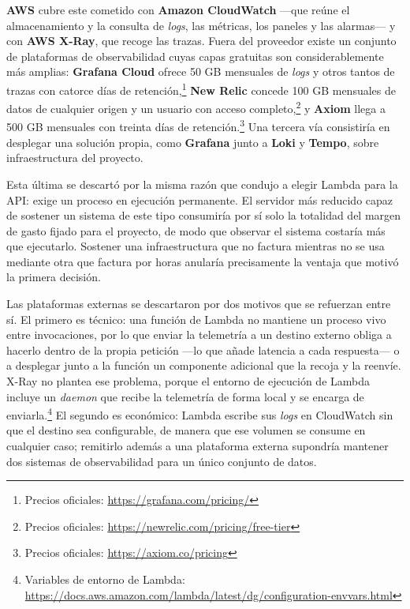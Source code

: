 \textbf{AWS} cubre este cometido con \textbf{Amazon CloudWatch} —que reúne el almacenamiento y la consulta de \textit{logs}, las métricas, los paneles y las alarmas— y con \textbf{AWS X-Ray}, que recoge las trazas. Fuera del proveedor existe un conjunto de plataformas de observabilidad cuyas capas gratuitas son considerablemente más amplias: \textbf{Grafana Cloud} ofrece 50 GB mensuales de \textit{logs} y otros tantos de trazas con catorce días de retención,\footnote{Precios oficiales: \url{https://grafana.com/pricing/}} \textbf{New Relic} concede 100 GB mensuales de datos de cualquier origen y un usuario con acceso completo,\footnote{Precios oficiales: \url{https://newrelic.com/pricing/free-tier}} y \textbf{Axiom} llega a 500 GB mensuales con treinta días de retención.\footnote{Precios oficiales: \url{https://axiom.co/pricing}} Una tercera vía consistiría en desplegar una solución propia, como \textbf{Grafana} junto a \textbf{Loki} y \textbf{Tempo}, sobre infraestructura del proyecto.

Esta última se descartó por la misma razón que condujo a elegir Lambda para la API: exige un proceso en ejecución permanente. El servidor más reducido capaz de sostener un sistema de este tipo consumiría por sí solo la totalidad del margen de gasto fijado para el proyecto, de modo que observar el sistema costaría más que ejecutarlo. Sostener una infraestructura que no factura mientras no se usa mediante otra que factura por horas anularía precisamente la ventaja que motivó la primera decisión.

Las plataformas externas se descartaron por dos motivos que se refuerzan entre sí. El primero es técnico: una función de Lambda no mantiene un proceso vivo entre invocaciones, por lo que enviar la telemetría a un destino externo obliga a hacerlo dentro de la propia petición —lo que añade latencia a cada respuesta— o a desplegar junto a la función un componente adicional que la recoja y la reenvíe. X-Ray no plantea ese problema, porque el entorno de ejecución de Lambda incluye un \textit{daemon} que recibe la telemetría de forma local y se encarga de enviarla.\footnote{Variables de entorno de Lambda: \url{https://docs.aws.amazon.com/lambda/latest/dg/configuration-envvars.html}} El segundo es económico: Lambda escribe sus \textit{logs} en CloudWatch sin que el destino sea configurable, de manera que ese volumen se consume en cualquier caso; remitirlo además a una plataforma externa supondría mantener dos sistemas de observabilidad para un único conjunto de datos.

